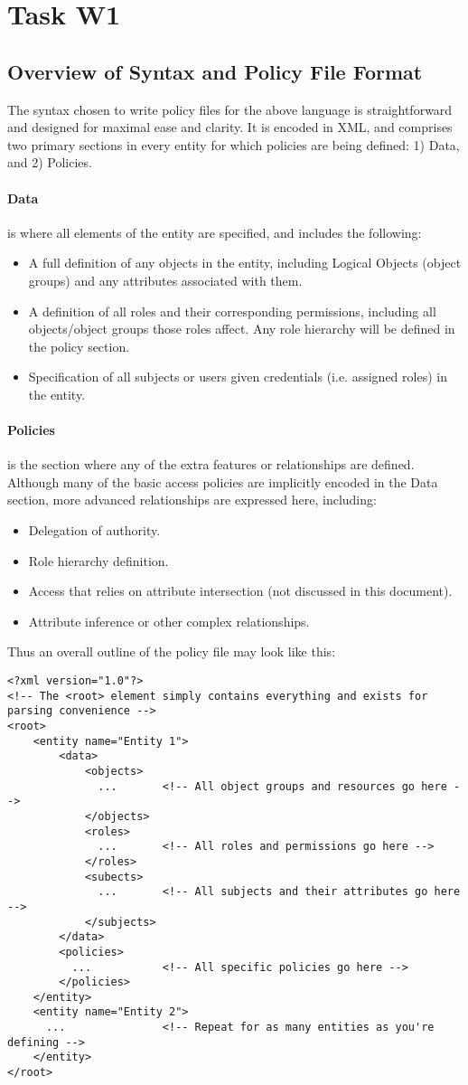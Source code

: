 \documentclass{article}
\providecommand{\task}[1]{\section{Task #1}}
\providecommand{\tightlist}{
    \setlength{\itemsep}{1pt}\setlength{\parskip}{0pt}
}
\begin{document}
\task{W1}
\subsection{Overview of Syntax and Policy File Format}
The syntax chosen to write policy files for the above language is straightforward and designed for maximal ease and clarity. It is encoded in XML, and comprises two primary sections in every entity for which policies are being defined: 1) Data, and 2) Policies.
\paragraph{Data} is where all elements of the entity are specified, and includes the following:
\begin{itemize}\tightlist
  \item A full definition of any objects in the entity, including Logical Objects (object groups) and any attributes associated with them.
  \item A definition of all roles and their corresponding permissions, including all objects/object groups those roles affect. Any role hierarchy will be defined in the policy section.
  \item Specification of all subjects or users given credentials (i.e. assigned roles) in the entity.
\end{itemize}
\paragraph{Policies} is the section where any of the extra features or relationships are defined. Although many of the basic access policies are implicitly encoded in the Data section, more advanced relationships are expressed here, including:
\begin{itemize}\tightlist
  \item Delegation of authority.
  \item Role hierarchy definition.
  \item Access that relies on attribute intersection (not discussed in this document).
  \item Attribute inference or other complex relationships.
\end{itemize}

Thus an overall outline of the policy file may look like this:
\begin{lstlisting}
<?xml version="1.0"?>
<!-- The <root> element simply contains everything and exists for parsing convenience -->
<root>
    <entity name="Entity 1">
        <data>
            <objects>
              ...       <!-- All object groups and resources go here -->
            </objects>
            <roles>
              ...       <!-- All roles and permissions go here -->
            </roles>
            <subects>
              ...       <!-- All subjects and their attributes go here -->
            </subjects>
        </data>
        <policies>
          ...           <!-- All specific policies go here -->
        </policies>
    </entity>
    <entity name="Entity 2">
      ...               <!-- Repeat for as many entities as you're defining -->
    </entity>
</root>
\end{lstlisting}
\end{document}
